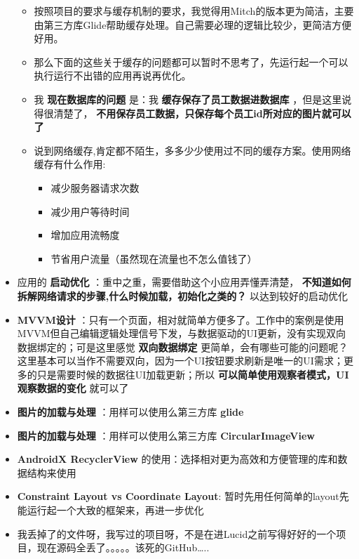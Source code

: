 \documentclass[9pt, b5paper]{article}
\begin{document}
\begin{itemize}
\begin{itemize}
\item 按照项目的要求与缓存机制的要求，我觉得用Mitch的版本更为简洁，主要由第三方库Glide帮助缓存处理。自己需要必理的逻辑比较少，更简洁方便好用。
\item 那么下面的这些关于缓存的问题都可以暂时不思考了，先运行起一个可以执行运行不出错的应用再说再优化。
\item 我 \textbf{现在数据库的问题} 是：我 \textbf{缓存保存了员工数据进数据库} ，但是这里说得很清楚了， \textbf{不用保存员工数据，只保存每个员工id所对应的图片就可以了}
\item 说到网络缓存,肯定都不陌生，多多少少使用过不同的缓存方案。使用网络缓存有什么作用:
\begin{itemize}
\item 减少服务器请求次数
\item 减少用户等待时间
\item 增加应用流畅度
\item 节省用户流量（虽然现在流量也不怎么值钱了）
\end{itemize}
\end{itemize}
\item 应用的 \textbf{启动优化} ：重中之重，需要借助这个小应用弄懂弄清楚， \textbf{不知道如何拆解网络请求的步骤,什么时候加载，初始化之类的？} 以达到较好的启动优化
\item \textbf{MVVM设计} ：只有一个页面，相对就简单方便多了。工作中的案例是使用MVVM但自己编辑逻辑处理信号下发，与数据驱动的UI更新，没有实现双向数据绑定的；可是这里感觉 \textbf{双向数据绑定} 更简单，会有哪些可能的问题呢？这里基本可以当作不需要双向，因为一个UI按钮要求刷新是唯一的UI需求；更多的只是需要时候的数据往UI加载更新；所以 \textbf{可以简单使用观察者模式，UI观察数据的变化} 就可以了
\item \textbf{图片的加载与处理} ：用样可以使用么第三方库 \textbf{glide}
\item \textbf{图片的加载与处理} ：用样可以使用么第三方库 \textbf{CircularImageView}
\item \textbf{AndroidX RecyclerView} 的使用：选择相对更为高效和方便管理的库和数据结构来使用
\item \textbf{Constraint Layout vs Coordinate Layout}: 暂时先用任何简单的layout先能运行起一个大致的框架来，再进一步优化
\item 我丢掉了的文件呀，我写过的项目呀，不是在进Lucid之前写得好好的一个项目，现在源码全丢了。。。。。该死的GitHub\ldots{}..
\end{itemize}
\end{document}
